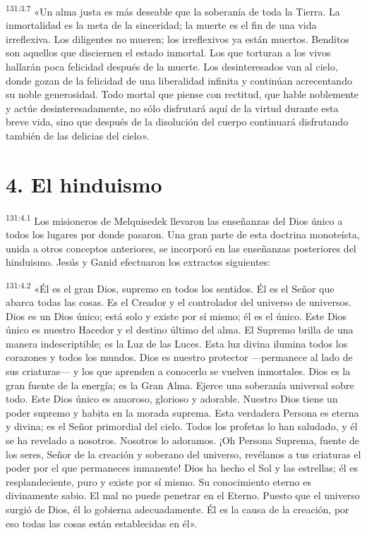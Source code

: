 \par
\textsuperscript{131:3.7} «Un alma justa es más deseable que la soberanía de toda la Tierra. La inmortalidad es la meta de la sinceridad; la muerte es el fin de una vida irreflexiva. Los diligentes no mueren; los irreflexivos ya están muertos. Benditos son aquellos que disciernen el estado inmortal. Los que torturan a los vivos hallarán poca felicidad después de la muerte. Los desinteresados van al cielo, donde gozan de la felicidad de una liberalidad infinita y continúan acrecentando su noble generosidad. Todo mortal que piense con rectitud, que hable noblemente y actúe desinteresadamente, no sólo disfrutará aquí de la virtud durante esta breve vida, sino que después de la disolución del cuerpo continuará disfrutando también de las delicias del cielo».

\section*{4. El hinduismo}
\par
\textsuperscript{131:4.1} Los misioneros de Melquisedek llevaron las enseñanzas del Dios único a todos los lugares por donde pasaron. Una gran parte de esta doctrina monoteísta, unida a otros conceptos anteriores, se incorporó en las enseñanzas posteriores del hinduismo. Jesús y Ganid efectuaron los extractos siguientes:

\par
\textsuperscript{131:4.2} «Él es el gran Dios, supremo en todos los sentidos. Él es el Señor que abarca todas las cosas. Es el Creador y el controlador del universo de universos. Dios es un Dios único; está solo y existe por sí mismo; él es el único. Este Dios único es nuestro Hacedor y el destino último del alma. El Supremo brilla de una manera indescriptible; es la Luz de las Luces. Esta luz divina ilumina todos los corazones y todos los mundos. Dios es nuestro protector ---permanece al lado de sus criaturas--- y los que aprenden a conocerlo se vuelven inmortales. Dios es la gran fuente de la energía; es la Gran Alma. Ejerce una soberanía universal sobre todo. Este Dios único es amoroso, glorioso y adorable. Nuestro Dios tiene un poder supremo y habita en la morada suprema. Esta verdadera Persona es eterna y divina; es el Señor primordial del cielo. Todos los profetas lo han saludado, y él se ha revelado a nosotros. Nosotros lo adoramos. ¡Oh Persona Suprema, fuente de los seres, Señor de la creación y soberano del universo, revélanos a tus criaturas el poder por el que permaneces inmanente! Dios ha hecho el Sol y las estrellas; él es resplandeciente, puro y existe por sí mismo. Su conocimiento eterno es divinamente sabio. El mal no puede penetrar en el Eterno. Puesto que el universo surgió de Dios, él lo gobierna adecuadamente. Él es la causa de la creación, por eso todas las cosas están establecidas en él».

